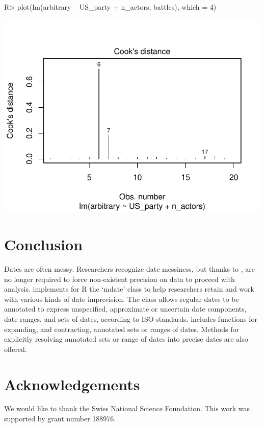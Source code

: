 \documentclass[
]{jss}
\begin{document}
\begin{CodeChunk}
\begin{CodeInput}
R> plot(lm(arbitrary ~ US_party + n_actors, battles), which = 4)
\end{CodeInput}


\begin{center}\includegraphics{messydates_article_files/figure-latex/outliers-1} \end{center}

\end{CodeChunk}

\hypertarget{conclusion}{%
\section{Conclusion}\label{conclusion}}

Dates are often messy. Researchers recognize date messiness, but thanks
to , are no longer required to force non-existent
precision on data to proceed with analysis.  implements
for R the `mdate' class to help researchers retain and work with various
kinds of date imprecision. The class allows regular dates to be
annotated to express unspecified, approximate or uncertain date
components, date ranges, and sets of dates, according to ISO standards.
 includes functions for expanding, and contracting,
annotated sets or ranges of dates. Methods for explicitly resolving
annotated sets or range of dates into precise dates are also offered.

\hypertarget{acknowledgements}{%
\section{Acknowledgements}\label{acknowledgements}}

We would like to thank the Swiss National Science Foundation. This work
was supported by grant number 188976.

\renewcommand\refname{References}

\end{document}
